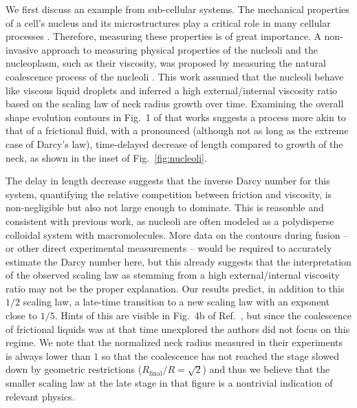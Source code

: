 \documentclass[%
reprint,
amsmath,amssymb,
aps,
]{revtex4-2}
\begin{document}
	We first discuss an example from sub-cellular systems. The mechanical properties of a cell's nucleus and its microstructures play a critical role in many cellular processes \cite{isermann2013nuclear,friedl2011nuclear}. Therefore, measuring these properties is of great importance. A non-invasive approach to measuring physical properties of the nucleoli and the nucleoplasm, such as their viscosity, was proposed by measuring the natural coalescence process of the nucleoli \cite{caragineSurfaceFluctuationsCoalescence2018a}. This work assumed that the nucleoli behave like viscous liquid droplets and inferred a high external/internal viscosity ratio based on the scaling law of neck radius growth over time. Examining the overall shape evolution contours in Fig.~1 of that works suggests a process more akin to that of a frictional fluid, with a pronounced (although not as long as the extreme case of Darcy's law), time-delayed decrease of length compared to growth of the neck, as shown in the inset of Fig.~\ref{fig:nucleoli}. 
 
 The delay in length decrease suggests that the inverse Darcy number for this system, quantifying the relative competition between friction and viscosity, is non-negligible but also not large enough to dominate. This is reasonble and consistent with previous work, as nucleoli are often modeled as a polydisperse colloidal system with macromolecules. More data on the contours during fusion -- or other direct experimental measurements -- would be required to accurately estimate the Darcy number here, but this already suggests that the interpretation of the observed scaling law as stemming from a high external/internal viscosity ratio may not be the proper explanation. Our results predict, in addition to this $1/2$ scaling law, a late-time transition to a new scaling law with an exponent close to $1/5$. Hints of this are visible in Fig.~4b of Ref.~\cite{caragineSurfaceFluctuationsCoalescence2018a}, but since the coalescence of frictional liquids was at that time unexplored the authors did not focus on this regime. We note that the normalized neck radius measured in their experiments is always lower than $1$ so that the coalescence has not reached the stage slowed down by geometric restrictions ($R_{\text{final}}/R=\sqrt{2}$) and thus we believe that the smaller scaling law at the late stage in that figure is a nontrivial indication of relevant physics.
 
\end{document}
